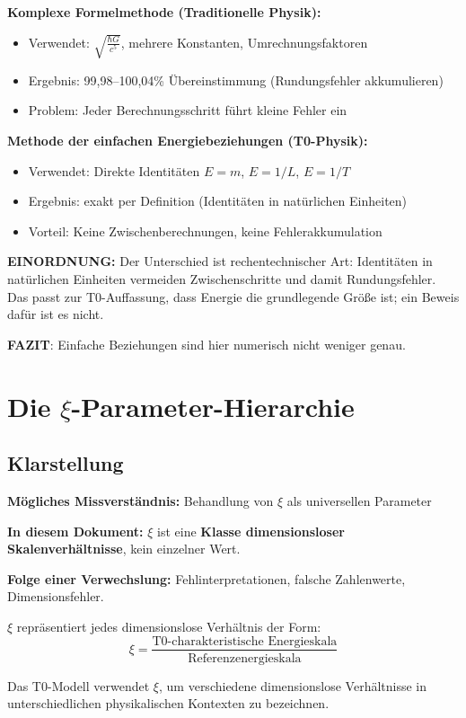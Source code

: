 	\begin{tcolorbox}[colback=blue!5!white,colframe=blue!75!black,title=Genauigkeit durch Vereinfachung]
		\textbf{Komplexe Formelmethode (Traditionelle Physik):}
		\begin{itemize}
			\item Verwendet: $\sqrt{\frac{\hbar G}{c^5}}$, mehrere Konstanten, Umrechnungsfaktoren
			\item Ergebnis: 99,98–100,04\% Übereinstimmung (Rundungsfehler akkumulieren)
			\item Problem: Jeder Berechnungsschritt führt kleine Fehler ein
		\end{itemize}
		
		\textbf{Methode der einfachen Energiebeziehungen (T0-Physik):}
		\begin{itemize}
			\item Verwendet: Direkte Identitäten $E = m$, $E = 1/L$, $E = 1/T$
			\item Ergebnis: exakt per Definition (Identitäten in natürlichen Einheiten)
			\item Vorteil: Keine Zwischenberechnungen, keine Fehlerakkumulation
		\end{itemize}
		
		\textbf{EINORDNUNG:}
		Der Unterschied ist rechentechnischer Art: Identitäten in natürlichen Einheiten vermeiden Zwischenschritte und damit Rundungsfehler. Das passt zur T0-Auffassung, dass Energie die grundlegende Größe ist; ein Beweis dafür ist es nicht.
		
		\textbf{FAZIT}: Einfache Beziehungen sind hier numerisch nicht weniger genau.
	\end{tcolorbox}
	
	\section{Die $\xi$-Parameter-Hierarchie}
	
	\subsection{Klarstellung}
	
	\begin{tcolorbox}[colback=red!10!white,colframe=red!75!black,title=Hinweis: Verwendung des Symbols $\xi$ in diesem Dokument]
		\textbf{Mögliches Missverständnis:} Behandlung von $\xi$ als universellen Parameter
		
		\textbf{In diesem Dokument:} $\xi$ ist eine \textbf{Klasse dimensionsloser Skalenverhältnisse}, kein einzelner Wert.
		
		\textbf{Folge einer Verwechslung:} Fehlinterpretationen, falsche Zahlenwerte, Dimensionsfehler.
		
		$\xi$ repräsentiert jedes dimensionslose Verhältnis der Form:
		\begin{equation}
			\xi = \frac{\text{T0-charakteristische Energieskala}}{\text{Referenzenergieskala}}
		\end{equation}
		
		Das T0-Modell verwendet $\xi$, um verschiedene dimensionslose Verhältnisse in unterschiedlichen physikalischen Kontexten zu bezeichnen.
	\end{tcolorbox}
	
